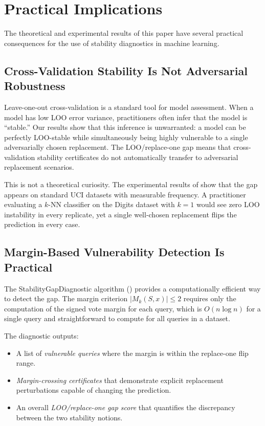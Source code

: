 \section{Practical Implications}
\label{sec:practical-implications}

The theoretical and experimental results of this paper have several practical
consequences for the use of stability diagnostics in machine learning.

\subsection{Cross-Validation Stability Is Not Adversarial Robustness}

Leave-one-out cross-validation is a standard tool for model assessment. When a
model has low LOO error variance, practitioners often infer that the model is
``stable.'' Our results show that this inference is unwarranted: a model can be
perfectly LOO-stable while simultaneously being highly vulnerable to a single
adversarially chosen replacement. The LOO/replace-one gap means that
cross-validation stability certificates do not automatically transfer to
adversarial replacement scenarios.

This is not a theoretical curiosity. The experimental results of
 show that the gap appears on standard UCI datasets
with measurable frequency. A practitioner evaluating a $k$-NN classifier on the
Digits dataset with $k=1$ would see zero LOO instability in every replicate, yet
a single well-chosen replacement flips the prediction in every case.

\subsection{Margin-Based Vulnerability Detection Is Practical}

The StabilityGapDiagnostic algorithm () provides
a computationally efficient way to detect the gap. The margin criterion
$|M_k(S, x)| \le 2$ requires only the computation of the signed vote margin for
each query, which is $O(n \log n)$ for a single query and straightforward to
compute for all queries in a dataset.

The diagnostic outputs:
\begin{itemize}
    \item A list of {\em vulnerable queries} where the margin is within the
        replace-one flip range.
    \item {\em Margin-crossing certificates} that demonstrate explicit
        replacement perturbations capable of changing the prediction.
    \item An overall {\em LOO/replace-one gap score} that quantifies the
        discrepancy between the two stability notions.
\end{itemize}

